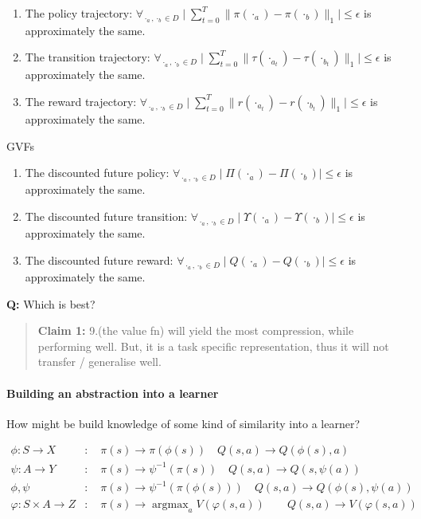 \begin{enumerate}
\def\labelenumi{\arabic{enumi}.}
\setcounter{enumi}{3}
\tightlist
\item
  The policy trajectory:
  \(\forall_{\cdot_a, \cdot_b \in D} \mid \sum_{t=0}^T \parallel \pi(\cdot_a) - \pi(\cdot_b)\parallel_1 \mid \le \epsilon\)
  is approximately the same.
\item
  The transition trajectory:
  \(\forall_{\cdot_a, \cdot_b \in D} \mid \sum_{t=0}^T\parallel \tau(\cdot_{a_t}) - \tau(\cdot_{b_t})\parallel_1\mid \le \epsilon\)
  is approximately the same.
\item
  The reward trajectory:
  \(\forall_{\cdot_a, \cdot_b \in D} \mid \sum_{t=0}^T \parallel r(\cdot_{a_t}) - r(\cdot_{b_t})\parallel_1 \mid \le \epsilon\)
  is approximately the same.
\end{enumerate}

GVFs

\begin{enumerate}
\def\labelenumi{\arabic{enumi}.}
\setcounter{enumi}{6}
\tightlist
\item
  The discounted future policy:
  \(\forall_{\cdot_a, \cdot_b \in D} \mid \Pi(\cdot_a) - \Pi(\cdot_b)\mid \le \epsilon\)
  is approximately the same.
\item
  The discounted future transition:
  \(\forall_{\cdot_a, \cdot_b \in D} \mid \Upsilon(\cdot_a) - \Upsilon (\cdot_b)\mid \le \epsilon\)
  is approximately the same.
\item
  The discounted future reward:
  \(\forall_{\cdot_a, \cdot_b \in D} \mid Q(\cdot_a) - Q(\cdot_b)\mid \le \epsilon\)
  is approximately the same.
\end{enumerate}

\textbf{Q:} Which is best?

\begin{quote}
\textbf{Claim 1:} 9.(the value fn) will yield the most compression,
while performing well. But, it is a task specific representation, thus
it will not transfer / generalise well.
\end{quote}



\paragraph{Building an abstraction into a learner}

How might be build knowledge of some kind of similarity into a learner?

\begin{align}
\phi: S \to X&: \quad \pi(s) \to \pi(\phi(s)) \quad Q(s, a) \to Q(\phi(s), a) \tag{State abstraction} \\
\psi: A\to Y&: \quad \pi(s) \to \psi^{-1}(\pi(s)) \quad Q(s, a) \to Q(s, \psi(a)) \tag{Action abstraction} \\
\phi, \psi&: \quad \pi(s) \to \psi^{-1}(\pi(\phi(s))) \quad Q(s, a) \to Q(\phi(s), \psi(a)) \tag{State and action abstraction} \\
\varphi: S \times A \to Z&: \quad \pi(s)\to \mathop{\text{argmax}}_a V(\varphi(s, a)) \quad\quad Q(s, a) \to V(\varphi(s, a)) \tag{State-action abstraction} \\
\end{align}

